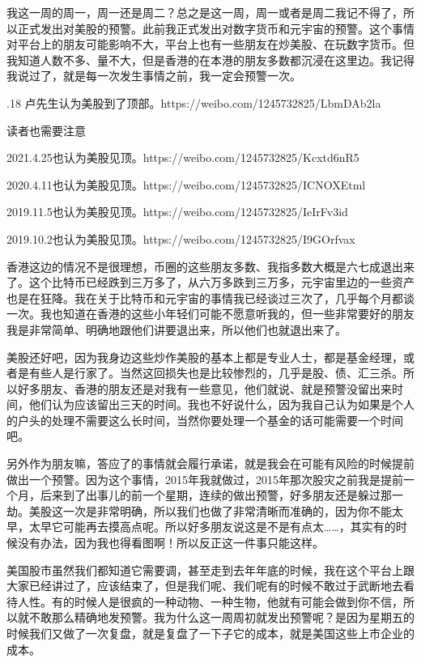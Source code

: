 \documentclass[UTF8, 12pt, a4paper]{ctexrep}
\begin{document}
我这一周的周一，周一还是周二？总之是这一周，周一或者是周二我记不得了，所以正式发出对美股的预警。此前我正式发出对数字货币和元宇宙的预警。这个事情对平台上的朋友可能影响不大，平台上也有一些朋友在炒美股、在玩数字货币。但我知道人数不多、量不大，但是香港的在本港的朋友多数都沉浸在这里边。我记得我说过了，就是每一次发生事情之前，我一定会预警一次。

{.18 卢先生认为美股到了顶部。https://weibo.com/1245732825/LbmDAb2la

读者也需要注意

2021.4.25也认为美股见顶。https://weibo.com/1245732825/Kcxtd6nR5

2020.4.11也认为美股见顶。https://weibo.com/1245732825/ICNOXEtml

2019.11.5也认为美股见顶。https://weibo.com/1245732825/IeIrFv3id

2019.10.2也认为美股见顶。https://weibo.com/1245732825/I9GOrfvax
}

香港这边的情况不是很理想，币圈的这些朋友多数、我指多数大概是六七成退出来了。这个比特币已经跌到三万多了，从六万多跌到三万多，元宇宙里边的一些资产也是在狂降。我在关于比特币和元宇宙的事情我已经谈过三次了，几乎每个月都谈一次。我也知道在香港的这些小年轻们可能不愿意听我的，但一些非常要好的朋友我是非常简单、明确地跟他们讲要退出来，所以他们也就退出来了。

美股还好吧，因为我身边这些炒作美股的基本上都是专业人士，都是基金经理，或者是有些人是行家了。当然这回损失也是比较惨烈的，几乎是股、债、汇三杀。所以好多朋友、香港的朋友还是对我有一些意见，他们就说、就是预警没留出来时间，他们认为应该留出三天的时间。我也不好说什么，因为我自己认为如果是个人的户头的处理不需要这么长时间，当然你要处理一个基金的话可能需要一个时间吧。

另外作为朋友嘛，答应了的事情就会履行承诺，就是我会在可能有风险的时候提前做出一个预警。因为这个事情，2015年我就做过，2015年那次股灾之前我是提前一个月，后来到了出事儿的前一个星期，连续的做出预警，好多朋友还是躲过那一劫。美股这一次是非常明确，所以我们也做了非常清晰而准确的，因为你不能太早，太早它可能再去摸高点呢。所以好多朋友说这是不是有点太……，其实有的时候没有办法，因为我也得看图啊！所以反正这一件事只能这样。

美国股市虽然我们都知道它需要调，甚至走到去年年底的时候，我在这个平台上跟大家已经讲过了，应该结束了，但是我们呢、我们呢有的时候不敢过于武断地去看待人性。有的时候人是很疯的一种动物、一种生物，他就有可能会做到你不信，所以就不敢那么精确地发预警。我为什么这一周周初就发出预警呢？是因为星期五的时候我们又做了一次复盘，就是复盘了一下子它的成本，就是美国这些上市企业的成本。
\end{document}
